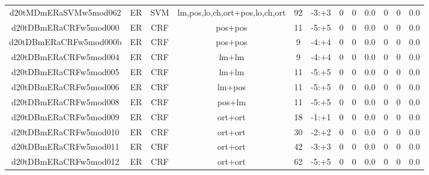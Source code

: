 \documentclass[a4paper]{article}
\begin{document}
\begin{landscape}
\begin{center}
\begin{tabular}{ |c|c|c|c|c|c|c|c|c|c|c|c|}
 
 	
 	\small{ d20tMDmERaSVMw5mod062 } & ER & SVM & lm,pos,lo,ch,ort+pos,lo,ch,ort  &  92 &  -3:+3  &  0 & 0 & 0.0  &  0 & 0 & 0.0 \\
 	

 
 	
 	\small{ d20tDBmERaCRFw5mod000 } & ER & CRF & pos+pos  &  11 &  -5:+5  &  0 & 0 & 0.0  &  0 & 0 & 0.0 \\
 	

 
 	
 	\small{ d20tDBmERaCRFw5mod000b } & ER & CRF & pos+pos  &  9 &  -4:+4  &  0 & 0 & 0.0  &  0 & 0 & 0.0 \\
 	

 
 	
 	\small{ d20tDBmERaCRFw5mod004 } & ER & CRF & lm+lm  &  9 &  -4:+4  &  0 & 0 & 0.0  &  0 & 0 & 0.0 \\
 	

 
 	
 	\small{ d20tDBmERaCRFw5mod005 } & ER & CRF & lm+lm  &  11 &  -5:+5  &  0 & 0 & 0.0  &  0 & 0 & 0.0 \\
 	

 
 	
 	\small{ d20tDBmERaCRFw5mod006 } & ER & CRF & lm+pos  &  11 &  -5:+5  &  0 & 0 & 0.0  &  0 & 0 & 0.0 \\
 	

 
 	
 	\small{ d20tDBmERaCRFw5mod008 } & ER & CRF & pos+lm  &  11 &  -5:+5  &  0 & 0 & 0.0  &  0 & 0 & 0.0 \\
 	

 
 	
 	\small{ d20tDBmERaCRFw5mod009 } & ER & CRF & ort+ort  &  18 &  -1:+1  &  0 & 0 & 0.0  &  0 & 0 & 0.0 \\
 	

 
 	
 	\small{ d20tDBmERaCRFw5mod010 } & ER & CRF & ort+ort  &  30 &  -2:+2  &  0 & 0 & 0.0  &  0 & 0 & 0.0 \\
 	

 
 	
 	\small{ d20tDBmERaCRFw5mod011 } & ER & CRF & ort+ort  &  42 &  -3:+3  &  0 & 0 & 0.0  &  0 & 0 & 0.0 \\
 	

 
 	
 	\small{ d20tDBmERaCRFw5mod012 } & ER & CRF & ort+ort  &  62 &  -5:+5  &  0 & 0 & 0.0  &  0 & 0 & 0.0 \\
 	


\end{tabular}
\end{center}
\end{landscape}
\end{document}
